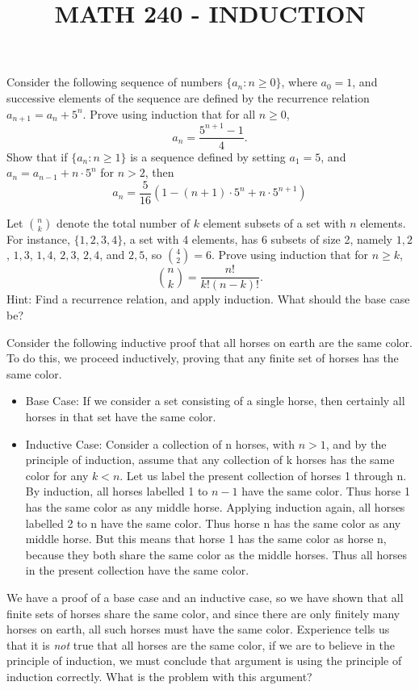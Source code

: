 \documentclass{exam}
\title{MATH 240 - INDUCTION}
\begin{document}
\pagestyle{headandfoot}
\runningfooter{}{}{}
\firstpageheadrule

\begin{questions}

\maketitle

\question Consider the following sequence of numbers $\{ a_n : n \geq 0 \}$, where $a_0 = 1$, and successive elements of the sequence are defined by the recurrence relation $a_{n+1} = a_n + 5^n$. Prove using induction that for all $n \geq 0$,
%
\[ a_n = \frac{5^{n+1} - 1}{4}. \]
%
Show that if $\{ a_n : n \geq 1 \}$ is a sequence defined by setting $a_1 = 5$, and $a_n = a_{n-1} + n \cdot 5^n$ for $n > 2$, then
%
\[ a_n = \frac{5}{16} \left( 1 - (n+1) \cdot 5^n + n \cdot 5^{n+1} \right) \]
\vspace{8em}

\question Let ${n \choose k}$ denote the total number of $k$ element subsets of a set with $n$ elements. For instance, $\{ 1, 2, 3, 4 \}$, a set with 4 elements, has 6 subsets of size 2, namely ${1,2}$, ${1,3}$, ${1,4}$, ${2,3}$, ${2,4}$, and ${2,5}$, so ${4 \choose 2} = 6$. Prove using induction that for $n \geq k$,
%
\[ {n \choose k} = \frac{n!}{k!(n-k)!}. \] 
%
Hint: Find a recurrence relation, and apply induction. What should the base case be?
\vspace{8em}

\question Consider the following inductive proof that all horses on earth are the same color. To do this, we proceed inductively, proving that any finite set of horses has the same color.
\begin{itemize}
	\item Base Case: If we consider a set consisting of a single horse, then certainly all horses in that set have the same color.
	\item Inductive Case: Consider a collection of n horses, with $n > 1$, and by the principle of induction, assume that any collection of k horses has the same color for any $k < n$. Let us label the present collection of horses 1 through n. By induction, all horses labelled 1 to $n-1$ have the same color. Thus horse 1 has the same color as any middle horse. Applying induction again, all horses labelled 2 to n have the same color. Thus horse n has the same color as any middle horse. But this means that horse 1 has the same color as horse n, because they both share the same color as the middle horses. Thus all horses in the present collection have the same color.
\end{itemize}
%
We have a proof of a base case and an inductive case, so we have shown that all finite sets of horses share the same color, and since there are only finitely many horses on earth, all such horses must have the same color. Experience tells us that it is \emph{not} true that all horses are the same color, if we are to believe in the principle of induction, we must conclude that argument is using the principle of induction correctly.  What is the problem with this argument?


\end{questions}
\end{document}
